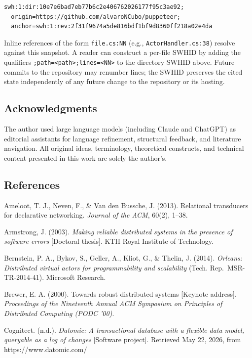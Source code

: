 \documentclass[
]{article}
\begin{document}
\begin{verbatim}
swh:1:dir:10e7e6bad7eb77b6c2e406762026177f95c3ae92;
  origin=https://github.com/alvaroNCubo/puppeteer;
  anchor=swh:1:rev:2f31f9674a5de816bdf1bf9d8360ff218a02e4da
\end{verbatim}

Inline references of the form \texttt{file.cs:NN} (e.g.,
\texttt{ActorHandler.cs:38}) resolve against this snapshot. A reader can
construct a per-file SWHID by adding the qualifiers
\texttt{;path=\textless{}path\textgreater{};lines=\textless{}NN\textgreater{}}
to the directory SWHID above. Future commits to the repository may
renumber lines; the SWHID preserves the cited state independently of any
future change to the repository or its hosting.

\subsection{Acknowledgments}\label{acknowledgments}

The author used large language models (including Claude and ChatGPT) as
editorial assistants for language refinement, structural feedback, and
literature navigation. All original ideas, terminology, theoretical
constructs, and technical content presented in this work are solely the
author's.

\subsection{References}\label{references}

Ameloot, T. J., Neven, F., \& Van den Bussche, J. (2013). Relational
transducers for declarative networking. \emph{Journal of the ACM},
60(2), 1--38.

Armstrong, J. (2003). \emph{Making reliable distributed systems in the
presence of software errors} {[}Doctoral thesis{]}. KTH Royal Institute
of Technology.

Bernstein, P. A., Bykov, S., Geller, A., Kliot, G., \& Thelin, J.
(2014). \emph{Orleans: Distributed virtual actors for programmability
and scalability} (Tech. Rep.~MSR-TR-2014-41). Microsoft Research.

Brewer, E. A. (2000). Towards robust distributed systems {[}Keynote
address{]}. \emph{Proceedings of the Nineteenth Annual ACM Symposium on
Principles of Distributed Computing (PODC '00)}.

Cognitect. (n.d.). \emph{Datomic: A transactional database with a
flexible data model, queryable as a log of changes} {[}Software
project{]}. Retrieved May 22, 2026, from https://www.datomic.com/
\end{document}
